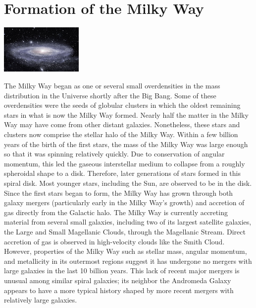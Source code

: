 \documentclass[11pt]{report}
\begin{document}
\section{Formation of the Milky Way}
\vspace{2mm}\begin{center}\includegraphics[width=4cm]{./img/milkyway.jpg}\end{center}
The Milky Way began as one or several small overdensities in the mass distribution in the Universe shortly after the Big Bang. Some of these overdensities were the seeds of globular clusters in which the oldest remaining stars in what is now the Milky Way formed. Nearly half the matter in the Milky Way may have come from other distant galaxies. Nonetheless, these stars and clusters now comprise the stellar halo of the Milky Way. Within a few billion years of the birth of the first stars, the mass of the Milky Way was large enough so that it was spinning relatively quickly. Due to conservation of angular momentum, this led the gaseous interstellar medium to collapse from a roughly spheroidal shape to a disk. Therefore, later generations of stars formed in this spiral disk. Most younger stars, including the Sun, are observed to be in the disk.\\
Since the first stars began to form, the Milky Way has grown through both galaxy mergers (particularly early in the Milky Way's growth) and accretion of gas directly from the Galactic halo. The Milky Way is currently accreting material from several small galaxies, including two of its largest satellite galaxies, the Large and Small Magellanic Clouds, through the Magellanic Stream. Direct accretion of gas is observed in high-velocity clouds like the Smith Cloud. However, properties of the Milky Way such as stellar mass, angular momentum, and metallicity in its outermost regions suggest it has undergone no mergers with large galaxies in the last 10 billion years. This lack of recent major mergers is unusual among similar spiral galaxies; its neighbor the Andromeda Galaxy appears to have a more typical history shaped by more recent mergers with relatively large galaxies.\\
\end{document}
